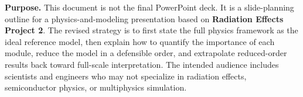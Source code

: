 \documentclass[11pt]{article}
\begin{document}

\begin{overviewbox}
\textbf{Purpose.} This document is not the final PowerPoint deck. It is a slide-planning outline for a physics-and-modeling presentation based on \textbf{Radiation Effects Project 2}. The revised strategy is to first state the full physics framework as the ideal reference model, then explain how to quantify the importance of each module, reduce the model in a defensible order, and extrapolate reduced-order results back toward full-scale interpretation. The intended audience includes scientists and engineers who may not specialize in radiation effects, semiconductor physics, or multiphysics simulation.
\end{overviewbox}

\ProjectTOC
\end{document}
